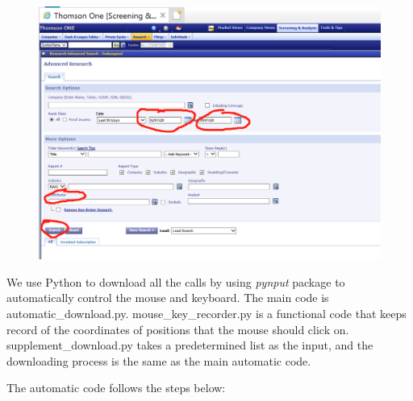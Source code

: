 \documentclass[11pt]{article}
\begin{document}
\begin{enumerate}
\begin{figure}[H]
\begin{center}
	\end{center}
	\end{figure}
	\begin{figure}[H]
	\begin{center}
	\includegraphics[width=.7\textwidth]{Figures/open_step3.png}
	\end{center}
	\end{figure}
\end{enumerate}
\par We use Python to download all the calls by using \textit{pynput} package to automatically control the mouse and keyboard. The main code is automatic\_download.py. mouse\_key\_recorder.py is a functional code that keeps record of the coordinates of positions that the mouse should click on. supplement\_download.py takes a predetermined list as the input, and the downloading process is the same as the main automatic code.
\par The automatic code follows the steps below:
\end{document}
